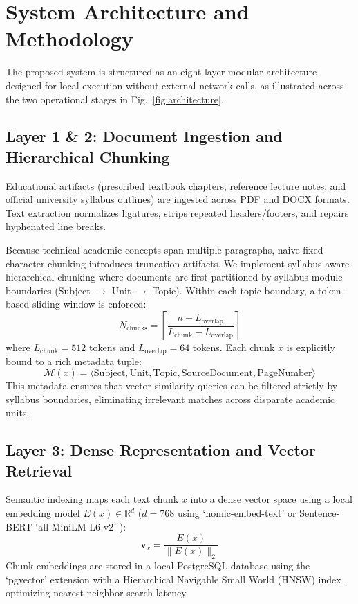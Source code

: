 \documentclass[conference]{IEEEtran}
\begin{document}
\section{System Architecture and Methodology}

The proposed system is structured as an eight-layer modular architecture designed for local execution without external network calls, as illustrated across the two operational stages in Fig.~\ref{fig:architecture}.

\subsection{Layer 1 \& 2: Document Ingestion and Hierarchical Chunking}
Educational artifacts (prescribed textbook chapters, reference lecture notes, and official university syllabus outlines) are ingested across PDF and DOCX formats. Text extraction normalizes ligatures, strips repeated headers/footers, and repairs hyphenated line breaks.

Because technical academic concepts span multiple paragraphs, naive fixed-character chunking introduces truncation artifacts. We implement syllabus-aware hierarchical chunking where documents are first partitioned by syllabus module boundaries (Subject $\to$ Unit $\to$ Topic). Within each topic boundary, a token-based sliding window is enforced:
\begin{equation}
N_{\text{chunks}} = \left\lceil \frac{n - L_{\text{overlap}}}{L_{\text{chunk}} - L_{\text{overlap}}} \right\rceil
\end{equation}
where $L_{\text{chunk}} = 512$ tokens and $L_{\text{overlap}} = 64$ tokens. Each chunk $x$ is explicitly bound to a rich metadata tuple:
\begin{equation}
\mathcal{M}(x) = \langle \text{Subject}, \text{Unit}, \text{Topic}, \text{SourceDocument}, \text{PageNumber} \rangle
\end{equation}
This metadata ensures that vector similarity queries can be filtered strictly by syllabus boundaries, eliminating irrelevant matches across disparate academic units.

\subsection{Layer 3: Dense Representation and Vector Retrieval}
Semantic indexing maps each text chunk $x$ into a dense vector space using a local embedding model $E(x) \in \mathbb{R}^d$ ($d=768$ using `nomic-embed-text' or Sentence-BERT `all-MiniLM-L6-v2' \cite{reimers2019sentence}):
\begin{equation}
\mathbf{v}_x = \frac{E(x)}{\|E(x)\|_2}
\end{equation}
Chunk embeddings are stored in a local PostgreSQL database using the `pgvector' extension with a Hierarchical Navigable Small World (HNSW) index \cite{malkov2020efficient}, optimizing nearest-neighbor search latency.
\end{document}
